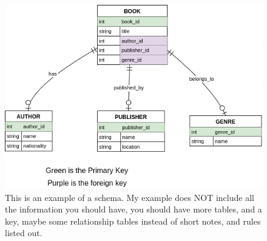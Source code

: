 \documentclass[12pt]{article}
\begin{document}
\begin{figure}[h!]
    \centerline{\includegraphics[scale=.7]{cis210schemaexampleV2.png}}
    \caption{This is an example of a schema. My example does NOT include all the information you should have, you should have more tables, and a key, maybe some relationship tables instead of short notes, and rules listed out.}

    \end{figure} 
\end{document}
